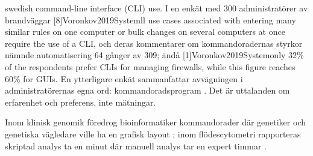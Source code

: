 \begin{onlyin}{swedish}
{command-line interface (CLI) use}.  I en enkät med 300 administratörer
av brandväggar
[8]{Voronkov2019System}{ll use
cases associated with entering many similar rules on one computer or
bulk changes on several computers at once require the use of a CLI},
och deras kommentarer om kommandoradernas styrkor nämnde automatisering
64 gånger av 309; ändå
[1]{Voronkov2019System}{only 32\% of the
respondents prefer CLIs for managing firewalls, while this figure
reaches 60\% for GUIs}.  En ytterligare enkät sammanfattar avvägningen i
administratörernas egna ord: kommandoradsprogram
.  Det är uttalanden om erfarenhet och preferens, inte
mätningar.

Inom klinisk genomik föredrog bioinformatiker kommandorader där
genetiker och genetiska vägledare ville ha en grafisk layout
\autocite{Shyr2015Dynamic}; inom flödescytometri rapporteras skriptad
analys ta en minut där manuell analys tar en expert timmar
\autocite{Brinkman2019Improving}.
\end{onlyin}

